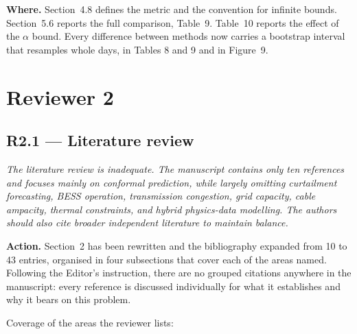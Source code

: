 \documentclass[11pt,a4paper]{article}
\newenvironment{revcomment}
  {\begin{mdframed}[backgroundcolor=quotebg,linecolor=quoterule,linewidth=0.4pt,
    innertopmargin=6pt,innerbottommargin=6pt,skipabove=8pt,skipbelow=8pt]\itshape}
  {\end{mdframed}}
\newcommand{\action}[1]{\textbf{Action.} #1}
\newcommand{\where}[1]{\textbf{Where.} #1}
\begin{document}
\where{Section~4.8 defines the metric and the convention for infinite bounds. Section~5.6 reports the full comparison, Table~9. Table~10 reports the effect of the $\alpha$ bound. Every difference between methods now carries a bootstrap interval that resamples whole days, in Tables 8 and 9 and in Figure~9.}

\clearpage
\section{Reviewer 2}

\subsection*{R2.1 --- Literature review}

\begin{revcomment}
The literature review is inadequate. The manuscript contains only ten references and focuses mainly on conformal prediction, while largely omitting curtailment forecasting, BESS operation, transmission congestion, grid capacity, cable ampacity, thermal constraints, and hybrid physics-data modelling. The authors should also cite broader independent literature to maintain balance.
\end{revcomment}

\action{Section~2 has been rewritten and the bibliography expanded from 10 to 43 entries, organised in four subsections that cover each of the areas named. Following the Editor's instruction, there are no grouped citations anywhere in the manuscript: every reference is discussed individually for what it establishes and why it bears on this problem.}

Coverage of the areas the reviewer lists:
\end{document}
